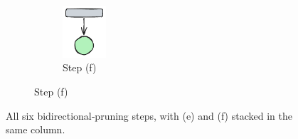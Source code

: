 \begin{figure}[htbp]
\begin{subfigure}[b]{0.23\textwidth}
		\vspace{0.5em}
		
		\begin{subfigure}[b]{\textwidth}
			\centering
			\includegraphics[width=0.23\textwidth]{plots/bidirectional_pruning_step_f_final.pdf}
			\caption{Step (f)}\label{fig:step:f:bottom}
		\end{subfigure}
	\end{subfigure}
	
	\caption{All six bidirectional‐pruning steps, with (e) and (f) stacked in the same column.}
	\label{fig:bidirectional_pruning}
\end{figure}




\newpage